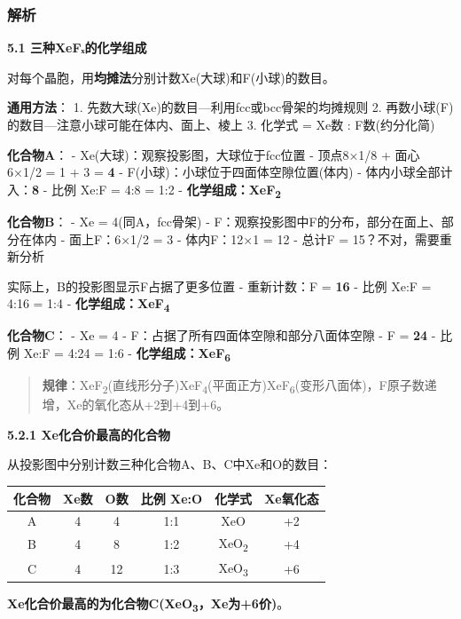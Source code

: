 \subsubsection{解析}\label{ux89e3ux6790-15}

\textbf{5.1 三种XeFₓ的化学组成}

对每个晶胞，用\textbf{均摊法}分别计数Xe(大球)和F(小球)的数目。

\textbf{通用方法}：
1. 先数大球(Xe)的数目---利用fcc或bcc骨架的均摊规则
2. 再数小球(F)的数目---注意小球可能在体内、面上、棱上
3. 化学式 = Xe数 : F数(约分化简)

\textbf{化合物A}：
- Xe(大球)：观察投影图，大球位于fcc位置
- 顶点8×1/8 + 面心6×1/2 = 1 + 3 = \textbf{4}
- F(小球)：小球位于四面体空隙位置(体内)
- 体内小球全部计入：\textbf{8}
- 比例 Xe:F = 4:8 = 1:2
- \textbf{化学组成：XeF\textsubscript{2}}

\textbf{化合物B}：
- Xe = 4(同A，fcc骨架)
- F：观察投影图中F的分布，部分在面上、部分在体内
- 面上F：6×1/2 = 3
- 体内F：12×1 = 12
- 总计F = 15？不对，需要重新分析

实际上，B的投影图显示F占据了更多位置
- 重新计数：F = \textbf{16}
- 比例 Xe:F = 4:16 = 1:4
- \textbf{化学组成：XeF\textsubscript{4}}

\textbf{化合物C}：
- Xe = 4
- F：占据了所有四面体空隙和部分八面体空隙
- F = \textbf{24}
- 比例 Xe:F = 4:24 = 1:6
- \textbf{化学组成：XeF\textsubscript{6}}

\begin{quote}
\textbf{规律}：XeF\textsubscript{2}(直线形分子)\箭 XeF\textsubscript{4}(平面正方)\箭 XeF\textsubscript{6}(变形八面体)，F原子数递增，Xe的氧化态从+2到+4到+6。
\end{quote}

\textbf{5.2.1 Xe化合价最高的化合物}

从投影图中分别计数三种化合物A、B、C中Xe和O的数目：

{\def\LTcaptype{none} %
\begin{longtable}[]{@{}cccccc@{}}
\toprule\noalign{}
化合物 & Xe数 & O数 & 比例 Xe:O & 化学式 & Xe氧化态 \\
\midrule\noalign{}
\endhead
\bottomrule\noalign{}
\endlastfoot
A & 4 & 4 & 1:1 & XeO & +2 \\
B & 4 & 8 & 1:2 & XeO\textsubscript{2} & +4 \\
C & 4 & 12 & 1:3 & XeO\textsubscript{3} & +6 \\
\end{longtable}
}

\textbf{Xe化合价最高的为化合物C(XeO\textsubscript{3}，Xe为+6价)}。

